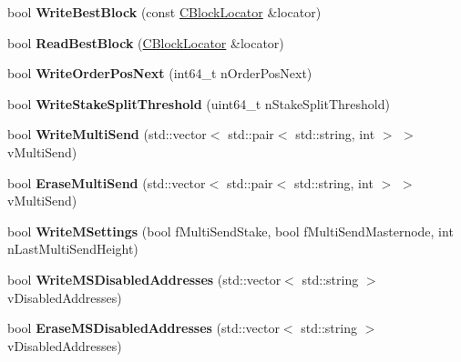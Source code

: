 \begin{DoxyCompactItemize}
\item 
\mbox{\label{class_c_wallet_d_b_a5660d366fee16ab81f3e7d3a97892486}} 
bool {\bfseries Write\+Best\+Block} (const \mbox{\hyperlink{struct_c_block_locator}{C\+Block\+Locator}} \&locator)
\item 
\mbox{\label{class_c_wallet_d_b_a20eecdac6605607ff7cba2f55ec86f73}} 
bool {\bfseries Read\+Best\+Block} (\mbox{\hyperlink{struct_c_block_locator}{C\+Block\+Locator}} \&locator)
\item 
\mbox{\label{class_c_wallet_d_b_a6a1f671e6376b38a1f73c8a023abdd38}} 
bool {\bfseries Write\+Order\+Pos\+Next} (int64\+\_\+t n\+Order\+Pos\+Next)
\item 
\mbox{\label{class_c_wallet_d_b_a30e68570809d41af56208bbb1af65ee1}} 
bool {\bfseries Write\+Stake\+Split\+Threshold} (uint64\+\_\+t n\+Stake\+Split\+Threshold)
\item 
\mbox{\label{class_c_wallet_d_b_a656f4a9f1b7c0466c794160356b3c2b4}} 
bool {\bfseries Write\+Multi\+Send} (std\+::vector$<$ std\+::pair$<$ std\+::string, int $>$ $>$ v\+Multi\+Send)
\item 
\mbox{\label{class_c_wallet_d_b_a55c05f8ca81afd32d055b5e2e51342e5}} 
bool {\bfseries Erase\+Multi\+Send} (std\+::vector$<$ std\+::pair$<$ std\+::string, int $>$ $>$ v\+Multi\+Send)
\item 
\mbox{\label{class_c_wallet_d_b_a78a239a6bd820854ac22cd15dd80d2c5}} 
bool {\bfseries Write\+M\+Settings} (bool f\+Multi\+Send\+Stake, bool f\+Multi\+Send\+Masternode, int n\+Last\+Multi\+Send\+Height)
\item 
\mbox{\label{class_c_wallet_d_b_a5f80cea3cf5f0e839819ed93ab1c696c}} 
bool {\bfseries Write\+M\+S\+Disabled\+Addresses} (std\+::vector$<$ std\+::string $>$ v\+Disabled\+Addresses)
\item 
\mbox{\label{class_c_wallet_d_b_ad0cdb58cbf268a56e463735b5290bbda}} 
bool {\bfseries Erase\+M\+S\+Disabled\+Addresses} (std\+::vector$<$ std\+::string $>$ v\+Disabled\+Addresses)

\end{DoxyCompactItemize}
